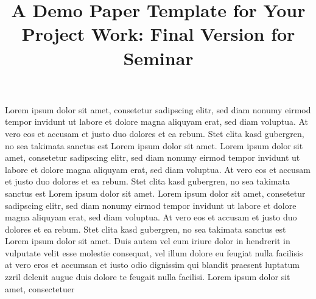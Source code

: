 \documentclass[9pt]{article}
\title{A Demo Paper Template for Your Project Work: Final Version for Seminar}
\date{}
\begin{document}
\makelogos
\thispagestyle{empty}

\makepapertitle

\begin{rgabstractbox}
Lorem ipsum dolor sit amet, consetetur sadipscing elitr, sed diam nonumy eirmod tempor invidunt ut labore et dolore magna aliquyam erat, sed diam voluptua. At vero eos et accusam et justo duo dolores et ea rebum. Stet clita kasd gubergren, no sea takimata sanctus est Lorem ipsum dolor sit amet. Lorem ipsum dolor sit amet, consetetur sadipscing elitr, sed diam nonumy eirmod tempor invidunt ut labore et dolore magna aliquyam erat, sed diam voluptua. At vero eos et accusam et justo duo dolores et ea rebum. Stet clita kasd gubergren, no sea takimata sanctus est Lorem ipsum dolor sit amet. Lorem ipsum dolor sit amet, consetetur sadipscing elitr, sed diam nonumy eirmod tempor invidunt ut labore et dolore magna aliquyam erat, sed diam voluptua. At vero eos et accusam et justo duo dolores et ea rebum. Stet clita kasd gubergren, no sea takimata sanctus est Lorem ipsum dolor sit amet. Duis autem vel eum iriure dolor in hendrerit in vulputate velit esse molestie consequat, vel illum dolore eu feugiat nulla facilisis at vero eros et accumsan et iusto odio dignissim qui blandit praesent luptatum zzril delenit augue duis dolore te feugait nulla facilisi. Lorem ipsum dolor sit amet, consectetuer


\end{rgabstractbox}

\vspace{1.2em}
\end{document}

